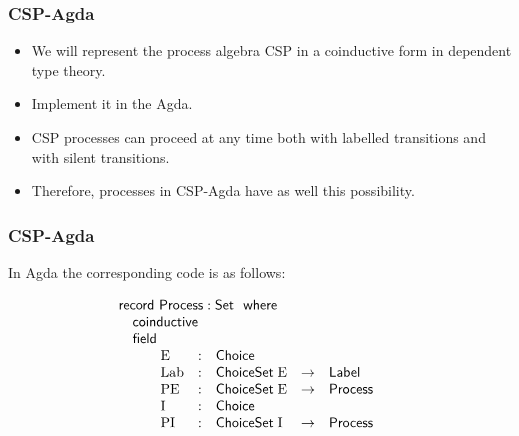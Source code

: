 \documentclass{beamer}
\newcommand{\ar}{\rightarrow}
\newcommand{\wheresf}{\mathsf{where}}
\newcommand{\Set}{\mathsf{Set}}
\newcommand{\record}{\mathsf{record}}
\newcommand{\coinductive}{\mathsf{coinductive}}
\newcommand{\field}{\mathsf{field}}
\newcommand{\Process}{\mathsf{Process}}
\newcommand{\Choice}{\mathsf{Choice}}
\newcommand{\ChoiceSet}{\mathsf{ChoiceSet}}
\newcommand{\Label}{\mathsf{Label}}
\newcommand{\pii}{\mathrm{PI}}
\newcommand{\pe}{\mathrm{PE}}
\newcommand{\ii}{\mathrm{I}}
\newcommand{\e}{\mathrm{E}}
\newcommand{\lab}{\mathrm{Lab}}
\begin{document}







\begin{frame}
\frametitle{CSP-Agda}

\begin{itemize}

\item We will represent the process algebra CSP in a coinductive form in dependent type theory.

\item Implement it in the Agda.

\item CSP processes can proceed at any time both with labelled transitions and with silent transitions.

\item Therefore, processes in CSP-Agda have as well this possibility.


\end{itemize}
\end{frame}




\begin{frame}
\frametitle{CSP-Agda}

In Agda the corresponding code is as follows: %

\[\begin{array}[t]{@{}l} 
\record\ \Process: \Set\ \ \wheresf  \\
\mbox{\quad}
\begin{array}[t]{@{}lcl} 
\coinductive \\
\field \\
\mbox{\quad} \begin{array}[t]{@{}l}
\begin{array}[t]{@{}clclcl}
 & \e  &:& \Choice \\
 & \lab  &:&  \ChoiceSet \;\e &\ar& \Label\\
 & \pe   &:& \ChoiceSet\;\e &\ar& \Process\\
 & \ii    &:&  \Choice\\
 & \pii   &:&  \ChoiceSet \;\ii  &\ar& \Process\\

\end{array} 
\end{array} 
\end{array} 
\end{array} \]


\end{frame}
\end{document}

